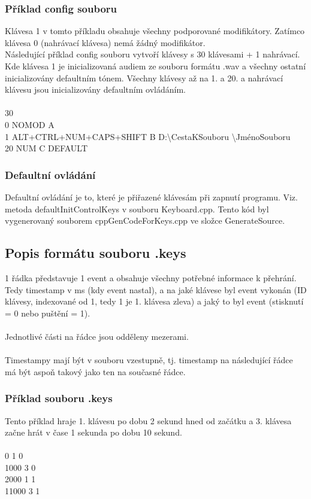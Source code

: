 \documentclass[12pt]{article}
\begin{document}
	\newpage
	\subsubsection{Příklad config souboru}
	Klávesa 1 v tomto příkladu obsahuje všechny podporované modifikátory. Zatímco klávesa 0 (nahrávací klávesa) nemá žádný modifikátor.
	\\
	Následující příklad config souboru vytvoří klávesy s 30 klávesami + 1 nahrávací. Kde klávesa 1 je inicializovaná audiem ze souboru formátu .wav a všechny ostatní inicializovány defaultním tónem. Všechny klávesy až na 1. a 20. a nahrávací klávesu jsou inicializovány defaultním ovládáním.
	\\
	\\
	30
	\\
	0 NOMOD A
	\\
	1 ALT+CTRL+NUM+CAPS+SHIFT B D:\textbackslash CestaKSouboru \textbackslash JménoSouboru
	\\
	20 NUM C DEFAULT
	
	\subsubsection{Defaultní ovládání}
	Defaultní ovládání je to, které je přiřazené klávesám při zapnutí programu. Viz. metoda defaultInitControlKeys v souboru Keyboard.cpp. Tento kód byl vygenerovaný souborem cppGenCodeForKeys.cpp ve složce GenerateSource.
	
	\newpage
	\subsection{Popis formátu souboru .keys}
	1 řádka představuje 1 event a obsahuje všechny potřebné informace k přehrání. Tedy timestamp v ms (kdy event nastal), a na jaké klávese byl event vykonán (ID klávesy, indexované od 1, tedy 1 je 1. klávesa zleva) a jaký to byl event (stisknutí = 0 nebo puštění = 1).
	\\
	\\
	Jednotlivé části na řádce jsou odděleny mezerami.
	\\
	\\
	Timestampy mají být v souboru vzestupně, tj. timestamp na následující řádce má být aspoň takový jako ten na současné řádce.
	
	\subsubsection{Příklad souboru .keys}
	Tento příklad hraje 1. klávesu po dobu 2 sekund hned od začátku a 3. klávesa začne hrát v čase 1 sekunda po dobu 10 sekund.
	\\
	\\ 
	0 1 0
	\\
	1000 3 0
	\\
	2000 1 1
	\\
	11000 3 1
	
\end{document}
